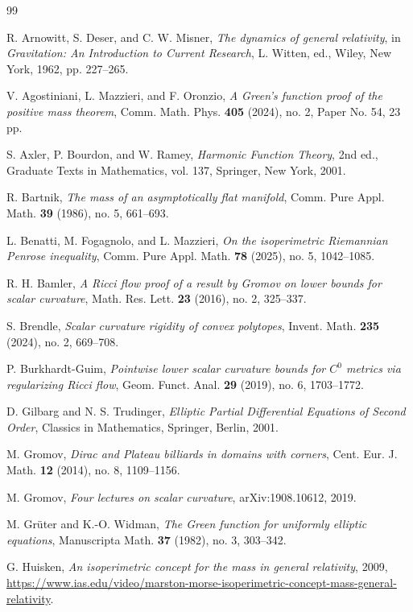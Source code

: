 \documentclass[11pt]{amsart}
\numberwithin{equation}{section}
\theoremstyle{definition}
\begin{document}
\begin{thebibliography}{99}

R. Arnowitt, S. Deser, and C. W. Misner,
\emph{The dynamics of general relativity},
in \emph{Gravitation: An Introduction to Current Research},
L. Witten, ed., Wiley, New York, 1962, pp. 227--265.

V. Agostiniani, L. Mazzieri, and F. Oronzio,
\emph{A Green's function proof of the positive mass theorem},
Comm. Math. Phys. \textbf{405} (2024), no. 2, Paper No. 54, 23 pp.

S. Axler, P. Bourdon, and W. Ramey,
\emph{Harmonic Function Theory},
2nd ed., Graduate Texts in Mathematics, vol. 137,
Springer, New York, 2001.

R. Bartnik,
\emph{The mass of an asymptotically flat manifold},
Comm. Pure Appl. Math. \textbf{39} (1986), no. 5, 661--693.

L. Benatti, M. Fogagnolo, and L. Mazzieri,
\emph{On the isoperimetric Riemannian Penrose inequality},
Comm. Pure Appl. Math. \textbf{78} (2025), no. 5, 1042--1085.

R. H. Bamler,
\emph{A Ricci flow proof of a result by Gromov on lower bounds for scalar curvature},
Math. Res. Lett. \textbf{23} (2016), no. 2, 325--337.

S. Brendle,
\emph{Scalar curvature rigidity of convex polytopes},
Invent. Math. \textbf{235} (2024), no. 2, 669--708.

P. Burkhardt-Guim,
\emph{Pointwise lower scalar curvature bounds for $C^0$ metrics via regularizing Ricci flow},
Geom. Funct. Anal. \textbf{29} (2019), no. 6, 1703--1772.

D. Gilbarg and N. S. Trudinger,
\emph{Elliptic Partial Differential Equations of Second Order},
Classics in Mathematics, Springer, Berlin, 2001.

M. Gromov,
\emph{Dirac and Plateau billiards in domains with corners},
Cent. Eur. J. Math. \textbf{12} (2014), no. 8, 1109--1156.

M. Gromov,
\emph{Four lectures on scalar curvature},
arXiv:1908.10612, 2019.

M. Gr\"uter and K.-O. Widman,
\emph{The Green function for uniformly elliptic equations},
Manuscripta Math. \textbf{37} (1982), no. 3, 303--342.

G. Huisken,
\emph{An isoperimetric concept for the mass in general relativity},
2009,
\url{https://www.ias.edu/video/marston-morse-isoperimetric-concept-mass-general-relativity}.


\end{thebibliography}
\end{document}
